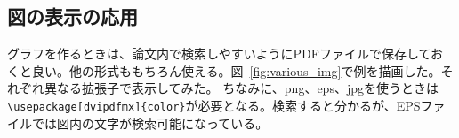 \documentclass[a4j]{jsarticle}
\begin{document}
\subsection{図の表示の応用}

グラフを作るときは、論文内で検索しやすいようにPDFファイルで保存しておくと良い。他の形式ももちろん使える。図~\ref{fig:various_img}で例を描画した。それぞれ異なる拡張子で表示してみた。
ちなみに、png、eps、jpgを使うときは\verb|\usepackage[dvipdfmx]{color}|が必要となる。検索すると分かるが、EPSファイルでは図内の文字が検索可能になっている。

\begin{figure}[htbp]
\centering
{}

\end{figure}
\end{document}
